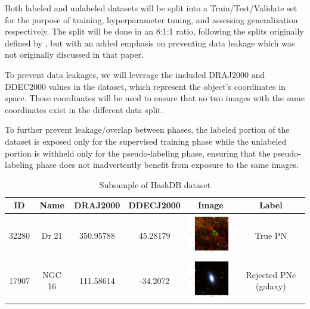 \documentclass{article}
\begin{document}
Both labeled and unlabeled datasets will be split into a Train/Test/Validate set for the purpose of training, hyperparameter tuning, and assessing generalization respectively. The split will be done in an 8:1:1 ratio, following the splits originally defined by \cite{awangiskandar2020}, but with an added emphasis on preventing data leakage which was not originally discussed in that paper.

To prevent data leakages, we will leverage the included DRAJ2000 and DDEC2000 values in the dataset, which represent the object's coordinates in space. These coordinates will be used to ensure that no two images with the same coordinates exist in the different data split. 

To further prevent leakage/overlap between phases, the labeled portion of the dataset is exposed only for the supervised training phase while the unlabeled portion is withheld only for the pseudo-labeling phase, ensuring that the pseudo-labeling phase does not inadvertently benefit from exposure to the same images.


\begin{table}[h!]
\centering
\begin{tabular}{|c|c|c|c|c|c|}
\hline
\textbf{ID} & \textbf{Name} & \textbf{DRAJ2000} & \textbf{DDECJ2000} & \textbf{Image} & \textbf{Label} \\ \hline
32280 & Dr 21 & 350.95788 & 45.28179 & \includegraphics[width=1in]{32280_wise432_rgb.png} & True PN \\ \hline
17907 & NGC 16 & 111.58614 & -34.2072 & \includegraphics[width=1in]{17907_sss_irb2.png} & Rejected PNe (galaxy) \\ \hline
\end{tabular}
\caption{Subsample of HashDB dataset}

\end{table}
\end{document}
